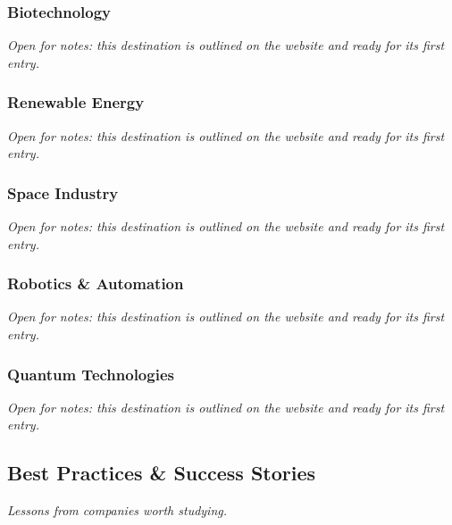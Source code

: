 \documentclass{article}
\begin{document}
\newpage

\subsubsection{Biotechnology}\label{sec:biotechnology}
\textit{Open for notes: this destination is outlined on the website and ready for its first entry.}

\subsubsection{Renewable Energy}\label{sec:renewable-energy}
\textit{Open for notes: this destination is outlined on the website and ready for its first entry.}

\subsubsection{Space Industry}\label{sec:space-industry}
\textit{Open for notes: this destination is outlined on the website and ready for its first entry.}

\subsubsection{Robotics \& Automation}\label{sec:robotics-and-automation}
\textit{Open for notes: this destination is outlined on the website and ready for its first entry.}

\subsubsection{Quantum Technologies}\label{sec:quantum-technologies}
\textit{Open for notes: this destination is outlined on the website and ready for its first entry.}

\subsection{Best Practices \& Success Stories}\label{sec:best-practices-and-success-stories}
\textit{Lessons from companies worth studying.}
\end{document}
